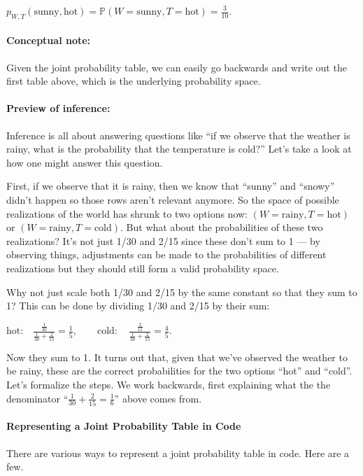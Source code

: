\documentclass[6008notes.tex]{subfiles}
\begin{document}
$p_{W,T}(\text {sunny},\text {hot})=\mathbb {P}(W=\text {sunny},T=\text {hot})=\frac{3}{10}.$
 
\paragraph{Conceptual note:} Given the joint probability table, we can easily go backwards and write out the first table above, which is the underlying probability space.

\paragraph{Preview of inference:} Inference is all about answering questions like ``if we observe that the weather is rainy, what is the probability that the temperature is cold?'' Let's take a look at how one might answer this question.

First, if we observe that it is rainy, then we know that ``sunny'' and ``snowy'' didn't happen so those rows aren't relevant anymore. So the space of possible realizations of the world has shrunk to two options now: $(W=\text {rainy},T=\text {hot})$ or $(W=\text {rainy},T=\text {cold})$. But what about the probabilities of these two realizations? It's not just 1/30 and 2/15 since these don't sum to 1 --- by observing things, adjustments can be made to the probabilities of different realizations but they should still form a valid probability space.

Why not just scale both 1/30 and 2/15 by the same constant so that they sum to 1? This can be done by dividing 1/30 and 2/15 by their sum:

$\text {hot:}\quad \frac{\frac{1}{30}}{\frac{1}{30}+\frac{2}{15}}=\frac{1}{5},\qquad 
 \text {cold}:\quad \frac{\frac{2}{15}}{\frac{1}{30}+\frac{2}{15}}=\frac{4}{5}.$
 
Now they sum to 1. It turns out that, given that we've observed the weather to be rainy, these are the correct probabilities for the two options ``hot'' and ``cold''. Let's formalize the steps. We work backwards, first explaining what the the denominator ``$\frac{1}{30}+\frac{2}{15}=\frac{1}{6}$'' above comes from.

\paragraph{Representing a Joint Probability Table in Code}

There are various ways to represent a joint probability table in code. Here are a few.
\end{document}
